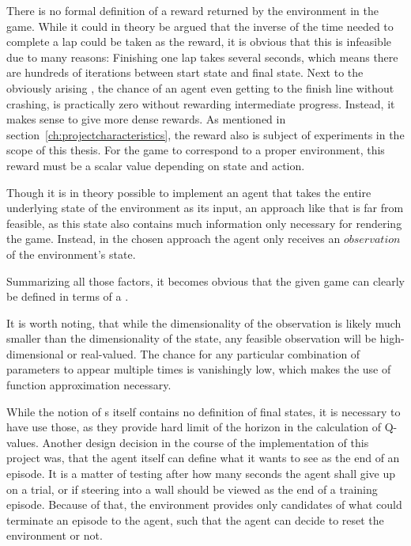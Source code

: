 There is no formal definition of a reward returned by the environment in the game. While it could in theory be argued that the inverse of the time needed to complete a lap could be taken as the reward, it is obvious that this is infeasible due to many reasons: Finishing one lap takes several seconds, which means there are hundreds of iterations between start state and final state. Next to the obviously arising , the chance of an agent even getting to the finish line without crashing, is practically zero without rewarding intermediate progress. Instead, it makes sense to give more dense rewards. As mentioned in section~\ref{ch:projectcharacteristics}, the reward also is subject of experiments in the scope of this thesis. For the game to correspond to a proper environment, this reward must be a scalar value depending on state and action.

Though it is in theory possible to implement an agent that takes the entire underlying state of the environment as its input, an approach like that is far from feasible, as this state also contains much information only necessary for rendering the game. Instead, in the chosen approach the agent only receives an $observation$ of the environment's state. 

Summarizing all those factors, it becomes obvious that the given game can clearly be defined in terms of a .

It is worth noting, that while the dimensionality of the observation is likely much smaller than the dimensionality of the state, any feasible observation will be high-dimensional or real-valued. The chance for any particular combination of parameters to appear multiple times is vanishingly low, which makes the use of function approximation necessary.

While the notion of s itself contains no definition of final states, it is necessary to have use those, as they provide hard limit of the horizon in the calculation of Q-values. Another design decision in the course of the implementation of this project was, that the agent itself can define what it wants to see as the end of an episode. It is a matter of testing after how many seconds the agent shall give up on a trial, or if steering into a wall should be viewed as the end of a training episode. Because of that, the environment provides only candidates of what could terminate an episode to the agent, such that the agent can decide to reset the environment or not. \\

